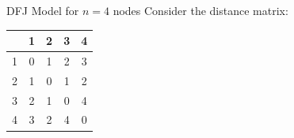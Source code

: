 \begin{example}{DFJ Model for $n=4$ nodes}{}
Consider the distance matrix:
\begin{center}
\begin{tabular}{|c|c|c|c|c|}
\hline
 & 1 & 2 & 3 & 4 \\
\hline
1 & 0 & 1 & 2 & 3 \\
\hline
2 & 1 & 0 & 1 & 2 \\
\hline
3 & 2 & 1 & 0 & 4 \\
\hline
4 & 3 & 2 & 4 & 0 \\
\hline
\end{tabular}
\end{center}







\end{example}
